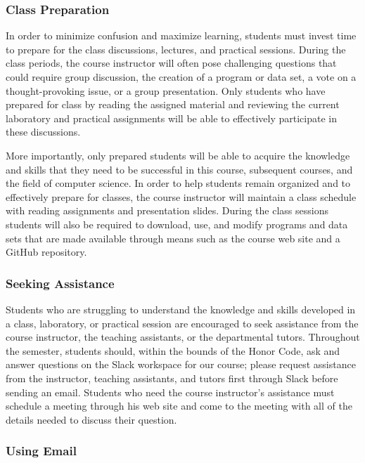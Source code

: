 \documentclass[11pt]{article}
\newcommand{\instructorpronoun}[1]{his}
\begin{document}
\vspace*{-.1in}

\subsubsection*{Class Preparation}

In order to minimize confusion and maximize learning, students must invest time
to prepare for the class discussions, lectures, and practical sessions. During
the class periods, the course instructor will often pose challenging questions
that could require group discussion, the creation of a program or data set, a
vote on a thought-provoking issue, or a group presentation. Only students who
have prepared for class by reading the assigned material and reviewing the
current laboratory and practical assignments will be able to effectively
participate in these discussions.

More importantly, only prepared students will be able to acquire the knowledge
and skills that they need to be successful in this course, subsequent courses,
and the field of computer science. In order to help students remain organized
and to effectively prepare for classes, the course instructor will maintain a
class schedule with reading assignments and presentation slides. During the
class sessions students will also be required to download, use, and modify
programs and data sets that are made available through means such as the course
web site and a GitHub repository.

\subsubsection*{Seeking Assistance}

Students who are struggling to understand the knowledge and skills developed in
a class, laboratory, or practical session are encouraged to seek assistance from
the course instructor, the teaching assistants, or the departmental tutors.
Throughout the semester, students should, within the bounds of the Honor Code,
ask and answer questions on the Slack workspace for our course; please request
assistance from the instructor, teaching assistants, and tutors first through
Slack before sending an email. Students who need the course instructor's
assistance must schedule a meeting through \instructorpronoun{} web site and
come to the meeting with all of the details needed to discuss their question.

\subsubsection*{Using Email}
\end{document}
